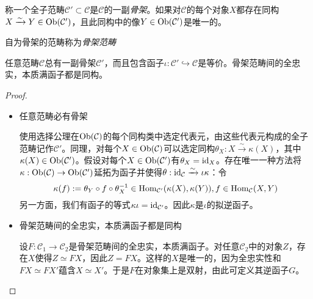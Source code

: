 \begin{Def}[骨架，骨架范畴] 称一个全子范畴$\mathcal{C}' \subset \mathcal{C}$是$\mathcal{C}$的一副\emph{骨架}。如果对$\mathcal{C}$的每个对象$X$都存在同构$X \xrightarrow{\sim} Y \in \operatorname{Ob}(\mathcal{C'})$，且此同构中的像$Y\in \operatorname{Ob}(\mathcal{C}')$是唯一的。

    自为骨架的范畴称为\emph{骨架范畴}
\end{Def}

\begin{Lem}\label{Lem 2.2.12}
    任意范畴$\mathcal{C}$总有一副骨架$\mathcal{C}'$，而且包含函子$\iota:\mathcal{C}' \hookrightarrow \mathcal{C}$是等价。骨架范畴间的全忠实，本质满函子都是同构。
    \begin{proof}
        \begin{itemize}
            \item 任意范畴必有骨架
            
            使用选择公理在$\operatorname{Ob}(\mathcal{C})$的每个同构类中选定代表元，由这些代表元构成的全子范畴记作$\mathcal{C'}$。同理，对每个$X\in \operatorname{Ob}(\mathcal{C})$可以选定同构$\theta_X:X\xrightarrow{\sim} \kappa(X)$，其中$\kappa(X)\in \operatorname{Ob}(\mathcal{C}')$。假设对每个$X\in \operatorname{Ob}(\mathcal{C}')$有$\theta_X=\mathrm{id}_X$。存在唯一一种方法将$\kappa:\operatorname{Ob}(\mathcal{C})\to \operatorname{Ob}(\mathcal{C}')$延拓为函子并使得$\theta:\mathrm{id}_{\mathcal{C}}\xrightarrow{\sim}\iota \kappa$：令
            \[
                \kappa(f):=\theta_Y \circ f \circ \theta_{X}^{-1} \in \operatorname{Hom}_{\mathcal{C}'}(\kappa(X),\kappa(Y)), f\in \operatorname{Hom}_{\mathcal{C}}(X,Y)
            \]
            另一方面，我们有函子的等式$\kappa \iota = \mathrm{id}_{\mathcal{C}'}$。因此$\kappa$是$\iota$的拟逆函子。
            \item 骨架范畴间的全忠实，本质满函子都是同构
            
            设$F:\mathcal{C}_1\to \mathcal{C}_2$是骨架范畴间的全忠实，本质满函子。对任意$\mathcal{C}_2$中的对象$Z$，存在$X$使得$Z\simeq F X$，因此$Z=FX$。这样的$X$是唯一的，因为全忠实性和$FX\simeq FX'$蕴含$X\simeq X'$。于是$F$在对象集上是双射，由此可定义其逆函子$G$。
        \end{itemize}
    \end{proof}
\end{Lem}

